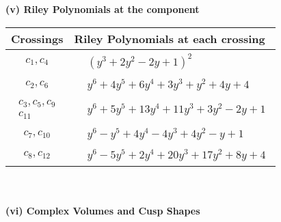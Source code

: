 \documentclass[1p]{elsarticle_modified}
\theoremstyle{definition}
\begin{document}
\newpage\renewcommand{\arraystretch}{1}
\flushleft \textbf{(v) Riley Polynomials at the component}\newline \\
\begin{tabular}{m{50pt}|m{274pt}}
Crossings & \hspace{64pt}Riley Polynomials at each crossing \\
\hline $$\begin{aligned}c_{1},c_{4}\end{aligned}$$&$\begin{aligned}
&(y^3+2 y^2-2 y+1)^2
\end{aligned}$\\
\hline $$\begin{aligned}c_{2},c_{6}\end{aligned}$$&$\begin{aligned}
&y^6+4 y^5+6 y^4+3 y^3+y^2+4 y+4
\end{aligned}$\\
\hline $$\begin{aligned}c_{3},c_{5},c_{9}\\c_{11}\end{aligned}$$&$\begin{aligned}
&y^6+5 y^5+13 y^4+11 y^3+3 y^2-2 y+1
\end{aligned}$\\
\hline $$\begin{aligned}c_{7},c_{10}\end{aligned}$$&$\begin{aligned}
&y^6- y^5+4 y^4-4 y^3+4 y^2- y+1
\end{aligned}$\\
\hline $$\begin{aligned}c_{8},c_{12}\end{aligned}$$&$\begin{aligned}
&y^6-5 y^5+2 y^4+20 y^3+17 y^2+8 y+4
\end{aligned}$\\
\hline
\end{tabular}\\~\\
\newpage\flushleft \textbf{(vi) Complex Volumes and Cusp Shapes}
\end{document}
